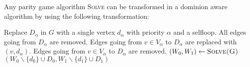 \documentclass[]{article}
\begin{document}
Any parity game algorithm \textsc{Solve} can be transformed in a dominion aware algorithm by using the following transformation:
\begin{algorithm}
	\caption{$\textsc{DASolveGeneric}(G, D_0, D_1)$}
	\begin{algorithmic}[1]
			\State Replace $D_\alpha$ in $G$ with a single vertex $d_\alpha$ with priority $\alpha$ and a selfloop. All edges going from $D_\alpha$ are removed. Edges going from $v \in V_\alpha$ to $D_\alpha$ are replaced with $(v,d_\alpha)$. Edges going from $v \in V_{\overline{\alpha}}$ to $D_\alpha$ are removed.
		\EndFor
		\State $(W_0, W_1) \gets \textsc{Solve(G)}$
		\State \Return $(W_0 \backslash \{d_0\} \cup D_0, W_1 \backslash \{d_1\} \cup D_1)$
	\end{algorithmic}
\end{algorithm}
\end{document}
